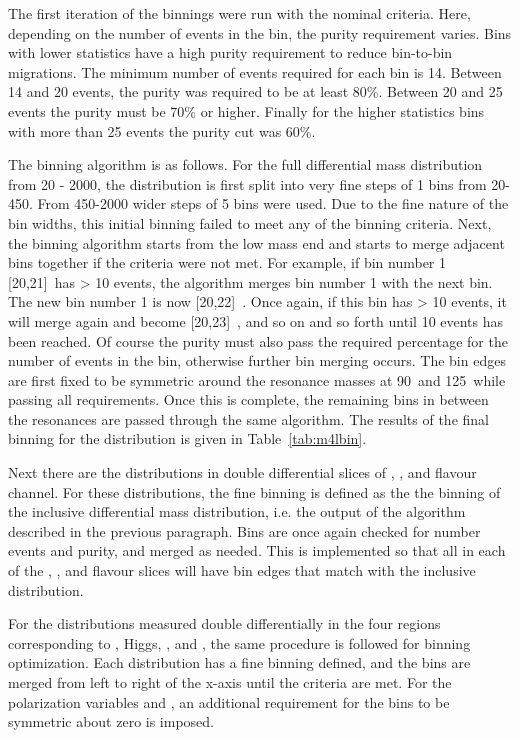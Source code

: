 The first iteration of the binnings were run with the nominal criteria. Here, depending on the number of events in the bin, the purity requirement varies. Bins with lower statistics have a high purity requirement to reduce bin-to-bin migrations. The minimum number of events required for each bin is 14. Between 14 and 20 events, the purity was required to be at least 80\%. Between 20 and 25 events the purity must be 70\% or higher. Finally for the higher statistics bins with more than 25 events the purity cut was 60\%. 

The binning algorithm is as follows. For the full \mFourL{} differential mass distribution from \unit{20}{\Gev} - \unit{2000}{\GeV}, the distribution is first split into very fine steps of \unit{1}{\GeV} bins from \unit{20}{\Gev}-\unit{450}{\GeV}. From \unit{450}{\Gev}-\unit{2000}{\GeV} wider steps of \unit{5}{\GeV} bins were used. Due to the fine nature of the bin widths, this initial binning failed to meet any of the binning criteria. Next, the binning algorithm starts from the low mass end and starts to merge adjacent bins together if the criteria were not met. For example, if bin number 1 [20,21]~\GeV has > 10 events, the algorithm merges bin number 1 with the next bin. The new bin number 1 is now [20,22]~\GeV. Once again, if this bin has > 10 events, it will merge again and become [20,23]~\GeV, and so on and so forth until 10 events has been reached. Of course the purity must also pass the required percentage for the number of events in the bin, otherwise further bin merging occurs. The bin edges are first fixed to be symmetric around the resonance masses at 90~\GeV and 125~\GeV while passing all requirements. Once this is complete, the remaining bins in between the resonances are passed through the same algorithm. The results of the final binning for the \mFourL{} distribution is given in Table~\ref{tab:m4lbin}.

Next there are the \mFourL{} distributions in double differential slices of \ptFourL, \yFourL, and flavour channel. For these distributions, the fine binning is defined as the the binning of the inclusive \mFourL{} differential mass distribution, i.e. the output of the algorithm described in the previous paragraph. Bins are once again checked for number events and purity, and merged as needed. This is implemented so that all \mFourL{} in each of the  \ptFourL, \yFourL, and flavour slices will have bin edges that match with the inclusive distribution. 

For the distributions measured double differentially in the four \mFourL{} regions corresponding to \Z, Higgs, \onshellZZ, and \offshellZZ, the same procedure is followed for binning optimization. Each distribution has a fine binning defined, and the bins are merged from left to right of the x-axis until the criteria are met. For the polarization variables \CTSOneTwo and \CTSThreeFour, an additional requirement for the bins to be symmetric about zero is imposed.

